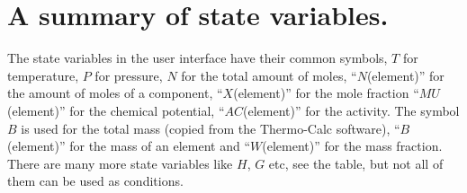 \documentclass[12pt]{article}
\begin{document}
\section{A summary of state variables.}

The state variables in the user interface have their common symbols,
$T$ for temperature, $P$ for pressure, $N$ for the total amount of
moles, ``$N$(element)'' for the amount of moles of a component,
``$X$(element)'' for the mole fraction ``$MU$(element)'' for the
chemical potential, ``$AC$(element)'' for the activity.  The symbol
$B$ is used for the total mass (copied from the Thermo-Calc software),
``$B$(element)'' for the mass of an element and ``$W$(element)'' for
the mass fraction.  There are many more state variables like $H$, $G$
etc, see the table, but not all of them can be used as conditions.
\end{document}
